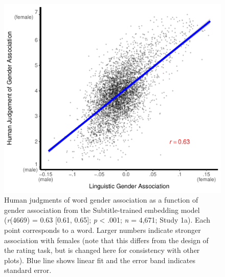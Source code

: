 \documentclass[9pt,twocolumn]{pnas-new}
\begin{document}
\newpage

\begin{figure}
\centering
\includegraphics{../figs/fig1.pdf}
\caption{ Human judgments of word gender association as
a function of gender association from the Subtitle-trained embedding model
(\emph{r}(4669) = 0.63 {[}0.61, 0.65{]}; \emph{p} \textless{} .001; {\emph n} = 4,671; Study 1a). Each point corresponds to a word. Larger numbers indicate
stronger association with females (note that this differs from the
design of the rating task, but is changed here for consistency with
other plots). Blue line shows linear fit and the error band indicates
standard error.}
\end{figure}
\end{document}
